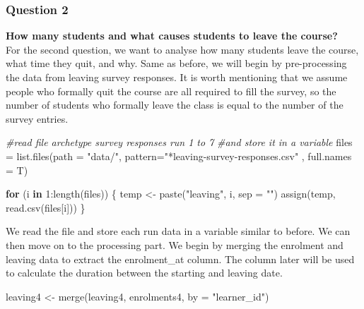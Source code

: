 \documentclass[12pt,]{article}
\newenvironment{Shaded}{\begin{snugshade}}{\end{snugshade}}
\newcommand{\AttributeTok}[1]{\textcolor[rgb]{0.77,0.63,0.00}{#1}}
\newcommand{\CommentTok}[1]{\textcolor[rgb]{0.56,0.35,0.01}{\textit{#1}}}
\newcommand{\ControlFlowTok}[1]{\textcolor[rgb]{0.13,0.29,0.53}{\textbf{#1}}}
\newcommand{\DecValTok}[1]{\textcolor[rgb]{0.00,0.00,0.81}{#1}}
\newcommand{\FunctionTok}[1]{\textcolor[rgb]{0.00,0.00,0.00}{#1}}
\newcommand{\NormalTok}[1]{#1}
\newcommand{\OtherTok}[1]{\textcolor[rgb]{0.56,0.35,0.01}{#1}}
\newcommand{\SpecialCharTok}[1]{\textcolor[rgb]{0.00,0.00,0.00}{#1}}
\newcommand{\StringTok}[1]{\textcolor[rgb]{0.31,0.60,0.02}{#1}}
\begin{document}
\hypertarget{question-2}{%
\subsubsection{Question 2}\label{question-2}}

\textbf{How many students and what causes students to leave the
course?}\\
\hfill\break For the second question, we want to analyse how many
students leave the course, what time they quit, and why. Same as before,
we will begin by pre-processing the data from leaving survey responses.
It is worth mentioning that we assume people who formally quit the
course are all required to fill the survey, so the number of students
who formally leave the class is equal to the number of the survey
entries.

\begin{Shaded}
\begin{Highlighting}[]
\CommentTok{\#read file archetype survey responses run 1 to 7 }
\CommentTok{\#and store it in a variable}
\NormalTok{files }\OtherTok{=} \FunctionTok{list.files}\NormalTok{(}\AttributeTok{path =} \StringTok{"data/"}\NormalTok{, }
                   \AttributeTok{pattern=}\StringTok{"*leaving{-}survey{-}responses.csv"}
\NormalTok{                   , }\AttributeTok{full.names =}\NormalTok{ T)}

\ControlFlowTok{for}\NormalTok{ (i }\ControlFlowTok{in} \DecValTok{1}\SpecialCharTok{:}\FunctionTok{length}\NormalTok{(files)) \{}
\NormalTok{  temp }\OtherTok{\textless{}{-}} \FunctionTok{paste}\NormalTok{(}\StringTok{"leaving"}\NormalTok{, i, }\AttributeTok{sep =} \StringTok{""}\NormalTok{)}
  \FunctionTok{assign}\NormalTok{(temp, }\FunctionTok{read.csv}\NormalTok{(files[i]))}
\NormalTok{\}}
\end{Highlighting}
\end{Shaded}

We read the file and store each run data in a variable similar to
before. We can then move on to the processing part. We begin by merging
the enrolment and leaving data to extract the enrolment\_at column. The
column later will be used to calculate the duration between the starting
and leaving date.

\begin{Shaded}
\begin{Highlighting}[]
\NormalTok{leaving4 }\OtherTok{\textless{}{-}} \FunctionTok{merge}\NormalTok{(leaving4, enrolments4, }\AttributeTok{by =} \StringTok{"learner\_id"}\NormalTok{)}
\end{Highlighting}
\end{Shaded}
\end{document}
